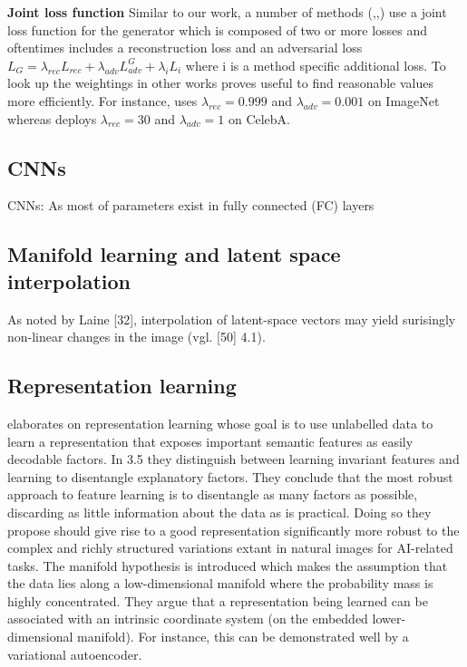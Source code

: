 \documentclass[11pt,a4paper]{article}
\begin{document}
\par \textbf{Joint loss function}
Similar to our work, a number of methods (\cite{1511.05440},\cite{1711.07410},\cite{1604.07379}) use a joint loss function for the generator which is composed of two or more losses and oftentimes includes a reconstruction loss and an adversarial loss $L_G = \lambda_{rec}L_{rec} + \lambda_{adv}L^G_{adv} + \lambda_{i}L_{i}$ where i is a method specific additional loss. To look up the weightings in other works proves useful to find reasonable values more efficiently. For instance, \cite{1604.07379} uses $\lambda_{rec} = 0.999$ and $\lambda_{adv} = 0.001$ on ImageNet whereas \cite{1711.07410} deploys $\lambda_{rec} = 30$ and $\lambda_{adv} = 1$ on CelebA.

\subsection{CNNs}
\par CNNs: As most of parameters exist in fully connected (FC) layers


\subsection{Manifold learning and latent space interpolation}
As noted by Laine [32], interpolation of latent-space vectors may yield surisingly non-linear changes in the image (vgl. [50] 4.1).


\subsection{Representation learning}
\par\cite{1206.5538} elaborates on representation learning whose goal is to use unlabelled data to learn a representation that exposes important semantic features as easily decodable factors. In 3.5 they distinguish between learning invariant features and learning to disentangle explanatory factors. They conclude that the most robust approach to feature learning is to disentangle as many factors as possible, discarding as little information about the data as is practical. Doing so they propose should give rise to a good representation significantly more robust to the complex and richly structured variations extant in natural images for AI-related tasks. The manifold hypothesis is introduced which makes the assumption that the data lies along a low-dimensional manifold where the probability mass is highly concentrated. They argue that a representation being learned can be associated with an intrinsic coordinate system (on the embedded lower-dimensional manifold). For instance, this can be demonstrated well by a variational autoencoder.
\end{document}

